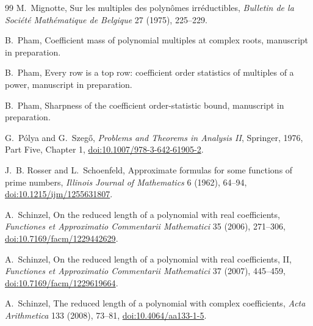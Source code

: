 \documentclass[11pt]{article}
\begin{document}
\begin{thebibliography}{99}
M.~Mignotte,
\newblock Sur les multiples des polyn\^omes irr\'eductibles,
\newblock \emph{Bulletin de la Soci\'et\'e Math\'ematique de Belgique} 27
(1975), 225--229.

B.~Pham,
\newblock Coefficient mass of polynomial multiples at complex roots,
\newblock manuscript in preparation.

B.~Pham,
\newblock Every row is a top row: coefficient order statistics of multiples
of a power,
\newblock manuscript in preparation.

B.~Pham,
\newblock Sharpness of the coefficient order-statistic bound,
\newblock manuscript in preparation.

G.~P\'olya and G.~Szeg\H{o},
\newblock \emph{Problems and Theorems in Analysis II},
\newblock Springer, 1976, Part Five, Chapter 1,
\newblock \href{https://doi.org/10.1007/978-3-642-61905-2}
{doi:10.1007/978-3-642-61905-2}.

J.~B. Rosser and L.~Schoenfeld,
\newblock Approximate formulas for some functions of prime numbers,
\newblock \emph{Illinois Journal of Mathematics} 6 (1962), 64--94,
\newblock \href{https://doi.org/10.1215/ijm/1255631807}
{doi:10.1215/ijm/1255631807}.

A.~Schinzel,
\newblock On the reduced length of a polynomial with real coefficients,
\newblock \emph{Functiones et Approximatio Commentarii Mathematici} 35
(2006), 271--306,
\newblock \href{https://doi.org/10.7169/facm/1229442629}
{doi:10.7169/facm/1229442629}.

A.~Schinzel,
\newblock On the reduced length of a polynomial with real coefficients, II,
\newblock \emph{Functiones et Approximatio Commentarii Mathematici} 37
(2007), 445--459,
\newblock \href{https://doi.org/10.7169/facm/1229619664}
{doi:10.7169/facm/1229619664}.

A.~Schinzel,
\newblock The reduced length of a polynomial with complex coefficients,
\newblock \emph{Acta Arithmetica} 133 (2008), 73--81,
\newblock \href{https://doi.org/10.4064/aa133-1-5}
{doi:10.4064/aa133-1-5}.
\end{thebibliography}
\end{document}

